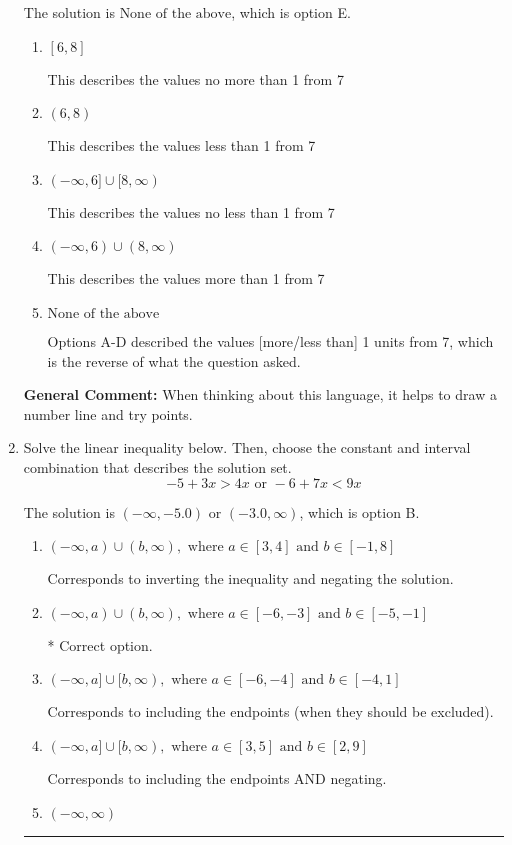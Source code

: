 \documentclass{extbook}[14pt]
\newcommand{\litem}[1]{\item #1

\rule{\textwidth}{0.4pt}}
\begin{document}
\begin{enumerate}
{The solution is \( \text{None of the above} \), which is option E.\begin{enumerate}[label=\Alph*.]
\item \( [6, 8] \)

This describes the values no more than 1 from 7
\item \( (6, 8) \)

This describes the values less than 1 from 7
\item \( (-\infty, 6] \cup [8, \infty) \)

This describes the values no less than 1 from 7
\item \( (-\infty, 6) \cup (8, \infty) \)

This describes the values more than 1 from 7
\item \( \text{None of the above} \)

Options A-D described the values [more/less than] 1 units from 7, which is the reverse of what the question asked.
\end{enumerate}

\textbf{General Comment:} When thinking about this language, it helps to draw a number line and try points.
}
\litem{
Solve the linear inequality below. Then, choose the constant and interval combination that describes the solution set.
\[ -5 + 3 x > 4 x \text{ or } -6 + 7 x < 9 x \]

The solution is \( (-\infty, -5.0) \text{ or } (-3.0, \infty) \), which is option B.\begin{enumerate}[label=\Alph*.]
\item \( (-\infty, a) \cup (b, \infty), \text{ where } a \in [3, 4] \text{ and } b \in [-1, 8] \)

Corresponds to inverting the inequality and negating the solution.
\item \( (-\infty, a) \cup (b, \infty), \text{ where } a \in [-6, -3] \text{ and } b \in [-5, -1] \)

 * Correct option.
\item \( (-\infty, a] \cup [b, \infty), \text{ where } a \in [-6, -4] \text{ and } b \in [-4, 1] \)

Corresponds to including the endpoints (when they should be excluded).
\item \( (-\infty, a] \cup [b, \infty), \text{ where } a \in [3, 5] \text{ and } b \in [2, 9] \)

Corresponds to including the endpoints AND negating.
\item \( (-\infty, \infty) \)


\end{enumerate}}
\end{enumerate}
\end{document}
